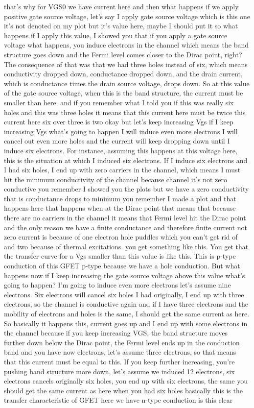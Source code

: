 that's why for VGS0 we have current here and then what happens if we apply positive gate source voltage, let's say I apply gate source voltage which is this one it's not denoted on my plot but it's value here, maybe I should put it so what happens if I apply this value, I showed you that if you apply a gate source voltage what happens, you induce electrons in the channel which means the band structure goes down and the Fermi level comes closer to the Dirac point, right? The consequence of that was that we had three holes instead of six, which means conductivity dropped down, conductance dropped down, and the drain current, which is conductance times the drain source voltage, drops down. So at this value of the gate source voltage, when this is the band structure, the current must be smaller than here. and if you remember what I told you if this was really six holes and this was three holes it means that this current here must be twice this current here six over three is two okay but let's keep increasing Vgs if I keep increasing Vgs what's going to happen I will induce even more electrons I will cancel out even more holes and the current will keep dropping down until I induce six electrons. For instance, assuming this happens at this voltage here, this is the situation at which I induced six electrons. If I induce six electrons and I had six holes, I end up with zero carriers in the channel, which means I must hit the minimum conductivity of the channel because channel it's not zero conductive you remember I showed you the plots but we have a zero conductivity that is conductance drops to minimum you remember I made a plot and that happens here that happens when at the Dirac point that means that because there are no carriers in the channel it means that Fermi level hit the Dirac point and the only reason we have a finite conductance and therefore finite current not zero current is because of one electron hole puddles which you can't get rid of and two because of thermal excitations. you get something like this. You get that the transfer curve for a Vgs smaller than this value is like this. This is p-type conduction of this GFET p-type because we have a hole conduction. But what happens now if I keep increasing the gate source voltage above this value what's going to happen? I'm going to induce even more electrons let's assume nine electrons. Six electrons will cancel six holes I had originally, I end up with three electrons, so the channel is conductive again and if I have three electrons and the mobility of electrons and holes is the same, I should get the same current as here. So basically it happens this, current goes up and I end up with some electrons in the channel because if you keep increasing VGS, the band structure moves further down below the Dirac point, the Fermi level ends up in the conduction band and you have now electrons, let's assume three electrons, so that means that this current must be equal to this. If you keep further increasing, you're pushing band structure more down, let's assume we induced 12 electrons, six electrons cancels originally six holes, you end up with six electrons, the same you should get the same current as here when you had six holes basically this is the transfer characteristic of GFET here we have n-type conduction is this clear 